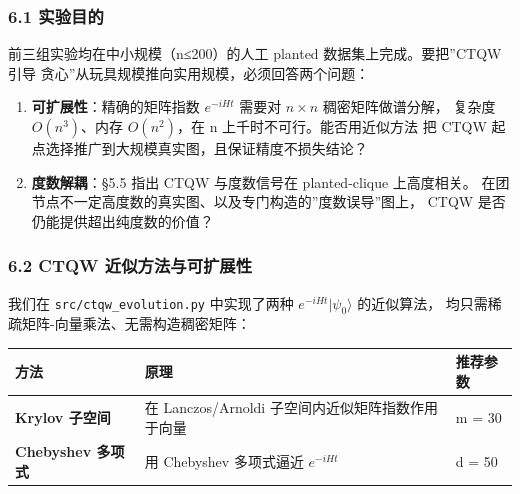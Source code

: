 \documentclass[
  11pt,
]{ctexart}
\newcounter{none} %
\providecommand{\tightlist}{%
  \setlength{\itemsep}{0pt}\setlength{\parskip}{0pt}}
\begin{document}
\subsubsection{6.1 实验目的}\label{ux5b9eux9a8cux76eeux7684-3}

前三组实验均在中小规模（n≤200）的人工 planted 数据集上完成。要把''CTQW
引导 贪心''从玩具规模推向实用规模，必须回答两个问题：

\begin{enumerate}
\def\labelenumi{\arabic{enumi}.}
\tightlist
\item
  \textbf{可扩展性}：精确的矩阵指数 \(e^{-iHt}\) 需要对 \(n\times n\)
  稠密矩阵做谱分解， 复杂度 \(O(n^3)\)、内存 \(O(n^2)\)，在 n
  上千时不可行。能否用近似方法 把 CTQW
  起点选择推广到大规模真实图，且保证精度不损失结论？
\item
  \textbf{度数解耦}：§5.5 指出 CTQW 与度数信号在 planted-clique
  上高度相关。
  在团节点不一定高度数的真实图、以及专门构造的''度数误导''图上， CTQW
  是否仍能提供超出纯度数的价值？
\end{enumerate}

\subsubsection{6.2 CTQW
近似方法与可扩展性}\label{ctqw-ux8fd1ux4f3cux65b9ux6cd5ux4e0eux53efux6269ux5c55ux6027}

我们在 \texttt{src/ctqw\_evolution.py} 中实现了两种
\(e^{-iHt}|\psi_0\rangle\) 的近似算法，
均只需稀疏矩阵-向量乘法、无需构造稠密矩阵：

{\def\LTcaptype{none} %
\begin{longtable}[]{@{}
  >{\raggedright\arraybackslash}p{}
  >{\raggedright\arraybackslash}p{}
  >{\raggedright\arraybackslash}p{}@{}}
\toprule\noalign{}
\begin{minipage}[b]{\linewidth}\raggedright
方法
\end{minipage} & \begin{minipage}[b]{\linewidth}\raggedright
原理
\end{minipage} & \begin{minipage}[b]{\linewidth}\raggedright
推荐参数
\end{minipage} \\
\midrule\noalign{}
\endhead
\bottomrule\noalign{}
\endlastfoot
\textbf{Krylov 子空间} & 在 Lanczos/Arnoldi
子空间内近似矩阵指数作用于向量 & m = 30 \\
\textbf{Chebyshev 多项式} & 用 Chebyshev 多项式逼近 \(e^{-iHt}\) & d =
50 \\
\end{longtable}
}
\end{document}

